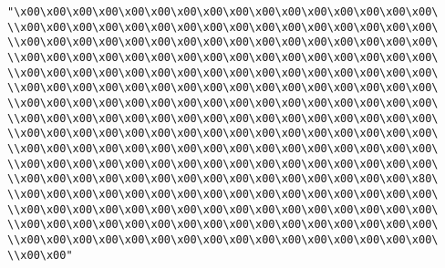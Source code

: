 \verb|"\x00\x00\x00\x00\x00\x00\x00\x00\x00\x00\x00\x00\x00\x00\x00\x00\|\newline
\verb|\\x00\x00\x00\x00\x00\x00\x00\x00\x00\x00\x00\x00\x00\x00\x00\x00\|\newline
\verb|\\x00\x00\x00\x00\x00\x00\x00\x00\x00\x00\x00\x00\x00\x00\x00\x00\|\newline
\verb|\\x00\x00\x00\x00\x00\x00\x00\x00\x00\x00\x00\x00\x00\x00\x00\x00\|\newline
\verb|\\x00\x00\x00\x00\x00\x00\x00\x00\x00\x00\x00\x00\x00\x00\x00\x00\|\newline
\verb|\\x00\x00\x00\x00\x00\x00\x00\x00\x00\x00\x00\x00\x00\x00\x00\x00\|\newline
\verb|\\x00\x00\x00\x00\x00\x00\x00\x00\x00\x00\x00\x00\x00\x00\x00\x00\|\newline
\verb|\\x00\x00\x00\x00\x00\x00\x00\x00\x00\x00\x00\x00\x00\x00\x00\x00\|\newline
\verb|\\x00\x00\x00\x00\x00\x00\x00\x00\x00\x00\x00\x00\x00\x00\x00\x00\|\newline
\verb|\\x00\x00\x00\x00\x00\x00\x00\x00\x00\x00\x00\x00\x00\x00\x00\x00\|\newline
\verb|\\x00\x00\x00\x00\x00\x00\x00\x00\x00\x00\x00\x00\x00\x00\x00\x00\|\newline
\verb|\\x00\x00\x00\x00\x00\x00\x00\x00\x00\x00\x00\x00\x00\x00\x00\x80\|\newline
\verb|\\x00\x00\x00\x00\x00\x00\x00\x00\x00\x00\x00\x00\x00\x00\x00\x00\|\newline
\verb|\\x00\x00\x00\x00\x00\x00\x00\x00\x00\x00\x00\x00\x00\x00\x00\x00\|\newline
\verb|\\x00\x00\x00\x00\x00\x00\x00\x00\x00\x00\x00\x00\x00\x00\x00\x00\|\newline
\verb|\\x00\x00\x00\x00\x00\x00\x00\x00\x00\x00\x00\x00\x00\x00\x00\x00\|\newline
\verb|\\x00\x00"|\newline
